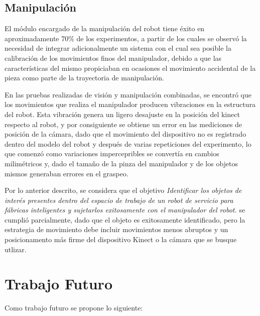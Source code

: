 \subsection{Manipulación}
El módulo encargado de la manipulación del robot tiene éxito en aproximadamente 70\% de los experimentos, a partir de los cuales se observó la necesidad de integrar adicionalmente un sistema con el cual sea posible la calibración de los movimientos finos del manipulador, debido a que las características del mismo propiciaban en ocasiones el movimiento accidental de la pieza como parte de la trayectoria de manipulación. 

En las pruebas realizadas de visión y manipulación combinadas, se encontró que los movimientos que realiza el manipulador producen vibraciones en la estructura del robot. Esta vibración genera un ligero desajuste en la posición del kinect respecto al robot, y por consiguiente se obtiene un error en las mediciones de posición de la cámara, dado que el movimiento del dispositivo no es registrado dentro del modelo del robot y después de varias repeticiones del experimento, lo que comenzó como variaciones impercepribles se convertía en cambios milimétricos y, dado el tamaño de la pinza del manipulador y de los objetos mismos generaban errores en el graspeo.


Por lo anterior descrito, se considera que el objetivo \textit{Identificar los objetos de interés presentes dentro del espacio de trabajo de un robot de servicio para fábricas inteligentes y sujetarlos exitosamente con el manipulador del robot.} se cumplió parcialmente, dado que el objeto es exitosamente identificado, pero la estrategia de movimiento debe incluir movimientos menos abruptos y un posicionamento más firme del dispositivo Kinect o la cámara que se busque utlizar.

\section{Trabajo Futuro}
Como trabajo futuro se propone lo siguiente:



